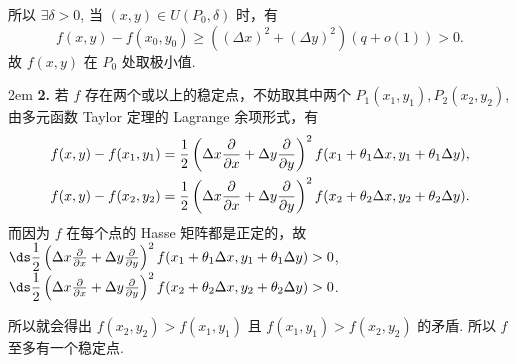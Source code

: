 \documentclass[UTF8,14pt,normal]{ctexart}
\begin{document}
    所以 \(\exists \delta > 0\), 当 \((x, y) \in U(P_0, \delta)\) 时，有
    \[
        f(x, y) - f(x_0, y_0) \geqslant ((\Delta x)^2 + (\Delta y)^2) (q + o(1)) > 0.
    \]
    故 \(f(x, y)\) 在 \(P_0\) 处取极小值.

    \hangindent 2em
    \noindent
    \textbf{2.} 若 \(f\) 存在两个或以上的稳定点，不妨取其中两个 \(P_1(x_1, y_1), P_2(x_2, y_2)\), 由多元函数 Taylor 定理的 Lagrange 余项形式，有
    \begin{gather*}
        f(x, y) - f(x_1, y_1) = \dfrac{1}{2} \left(\Delta x \pdv{x} + \Delta y \pdv{y}\right)^2 f(x_1 + \theta_1 \Delta x, y_1 + \theta_1 \Delta y), \\
        f(x, y) - f(x_2, y_2) = \dfrac{1}{2} \left(\Delta x \pdv{x} + \Delta y \pdv{y}\right)^2 f(x_2 + \theta_2 \Delta x, y_2 + \theta_2 \Delta y).
    \end{gather*}
    而因为 \(f\) 在每个点的 Hasse 矩阵都是正定的，故 \(\ds \dfrac{1}{2} \left(\Delta x \pdv{x} + \Delta y \pdv{y}\right)^2 f(x_1 + \theta_1 \Delta x, y_1 + \theta_1 \Delta y) > 0\), \(\ds \dfrac{1}{2} \left(\Delta x \pdv{x} + \Delta y \pdv{y}\right)^2 f(x_2 + \theta_2 \Delta x, y_2 + \theta_2 \Delta y) > 0\).

    所以就会得出 \(f(x_2, y_2) > f(x_1, y_1)\) 且 \(f(x_1, y_1) > f(x_2, y_2)\) 的矛盾. 所以 \(f\) 至多有一个稳定点.
\end{document}
